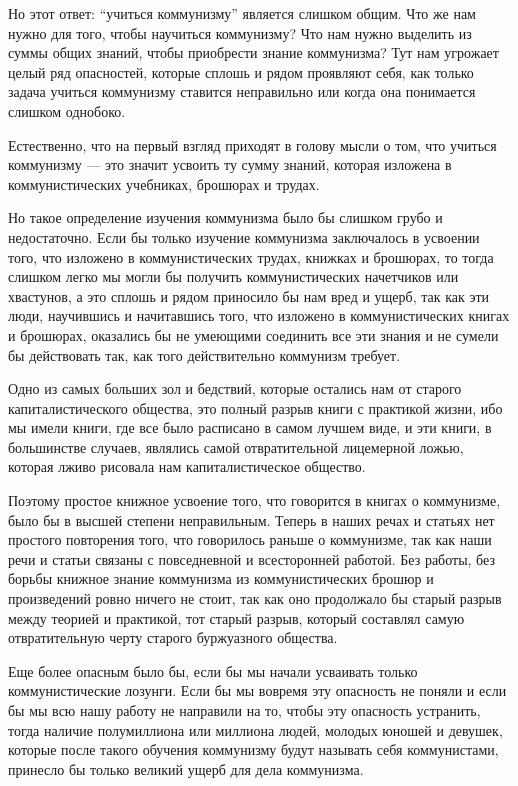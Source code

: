 \documentclass[12pt]{article}
\newcommand{\parnum}{(\arabic{parcount})}
\newcounter{parcount}
\newenvironment{parnumbers}{%
  \par%
  \everypar{\noindent \stepcounter{parcount}\marginpar[]{\parnum}}%
}{}
\begin{document}
\begin{parnumbers}
Но этот ответ: “учиться коммунизму” является слишком общим. Что же нам нужно для того, чтобы научиться коммунизму? Что нам нужно выделить из суммы общих знаний, чтобы приобрести знание коммунизма? Тут нам угрожает целый ряд опасностей, которые сплошь и рядом проявляют себя, как только задача учиться коммунизму ставится неправильно или когда она понимается слишком однобоко.

Естественно, что на первый взгляд приходят в голову мысли о том, что учиться коммунизму — это значит усвоить ту сумму знаний, которая изложена в коммунистических учебниках, брошюрах и трудах.

Но такое определение изучения коммунизма было бы слишком грубо и недостаточно. Если бы только изучение коммунизма заключалось в усвоении того, что изложено в коммунистических трудах, книжках и брошюрах, то тогда слишком легко мы могли бы получить коммунистических начетчиков или хвастунов, а это сплошь и рядом приносило бы нам вред и ущерб, так как эти люди, научившись и начитавшись того, что изложено в коммунистических книгах и брошюрах, оказались бы не умеющими соединить все эти знания и не сумели бы действовать так, как того действительно коммунизм требует.

Одно из самых больших зол и бедствий, которые остались нам от старого капиталистического общества, это полный разрыв книги с практикой жизни, ибо мы имели книги, где все было расписано в самом лучшем виде, и эти книги, в большинстве случаев, являлись самой отвратительной лицемерной ложью, которая лживо рисовала нам капиталистическое общество.

Поэтому простое книжное усвоение того, что говорится в книгах о коммунизме, было бы в высшей степени неправильным. Теперь в наших речах и статьях нет простого повторения того, что говорилось раньше о коммунизме, так как наши речи и статьи связаны с повседневной и всесторонней работой. Без работы, без борьбы книжное знание коммунизма из коммунистических брошюр и произведений ровно ничего не стоит, так как оно продолжало бы старый разрыв между теорией и практикой, тот старый разрыв, который составлял самую отвратительную черту старого буржуазного общества.

Еще более опасным было бы, если бы мы начали усваивать только коммунистические лозунги. Если бы мы вовремя эту опасность не поняли и если бы мы всю нашу работу не направили на то, чтобы эту опасность устранить, тогда наличие полумиллиона или миллиона людей, молодых юношей и девушек, которые после такого обучения коммунизму будут называть себя коммунистами, принесло бы только великий ущерб для дела коммунизма.


\end{parnumbers}
\end{document}
